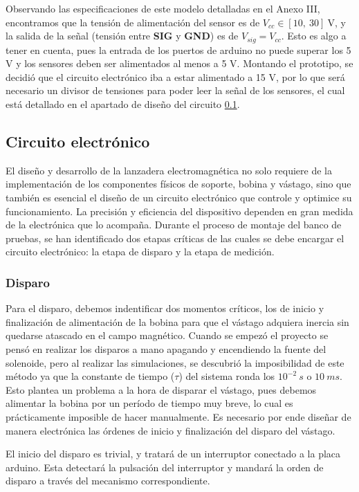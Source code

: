 Observando las especificaciones de este modelo detalladas en el Anexo III, encontramos que la tensión de alimentación del sensor es de \(V_{cc}\in [10,~30]~\text{V}\), y la salida de la señal (tensión entre \textbf{SIG} y \textbf{GND}) es de \(V_{sig}=V_{cc}\). Esto es algo a tener en cuenta, pues la entrada de los puertos de arduino no puede superar los 5 V y los sensores deben ser alimentados al menos a 5 V. Montando el prototipo, se decidió que el circuito electrónico iba a estar alimentado a 15 V, por lo que será necesario un divisor de tensiones para poder leer la señal de los sensores, el cual está detallado en el apartado de diseño del circuito \ref{subsec:circuito}.

\subsection{Circuito electrónico}
\label{subsec:circuito}
El diseño y desarrollo de la lanzadera electromagnética no solo requiere de la implementación de los componentes físicos de soporte, bobina y vástago, sino que también es esencial el diseño de un circuito electrónico que controle y optimice su funcionamiento. La precisión y eficiencia del dispositivo dependen en gran medida de la electrónica que lo acompaña. Durante el proceso de montaje del banco de pruebas, se han identificado dos etapas críticas de las cuales se debe encargar el circuito electrónico: la etapa de disparo y la etapa de medición.

\subsubsection*{Disparo}

Para el disparo, debemos indentificar dos momentos críticos, los de inicio y finalización de alimentación de la bobina para que el vástago adquiera inercia sin quedarse atascado en el campo magnético. Cuando se empezó el proyecto se pensó en realizar los disparos a mano apagando y encendiendo la fuente del solenoide, pero al realizar las simulaciones, se descubrió la imposibilidad de este método ya que la constante de tiempo (\(\tau\)) del sistema ronda los \(10^{-2}~s\) o \(10~ms\). Esto plantea un problema a la hora de disparar el vástago, pues debemos alimentar la bobina por un período de tiempo muy breve, lo cual es prácticamente imposible de hacer manualmente. Es necesario por ende diseñar de manera electrónica las órdenes de inicio y finalización del disparo del vástago.

El inicio del disparo es trivial, y tratará de un interruptor conectado a la placa arduino. Esta detectará la pulsación del interruptor y mandará la orden de disparo a través del mecanismo correspondiente.

